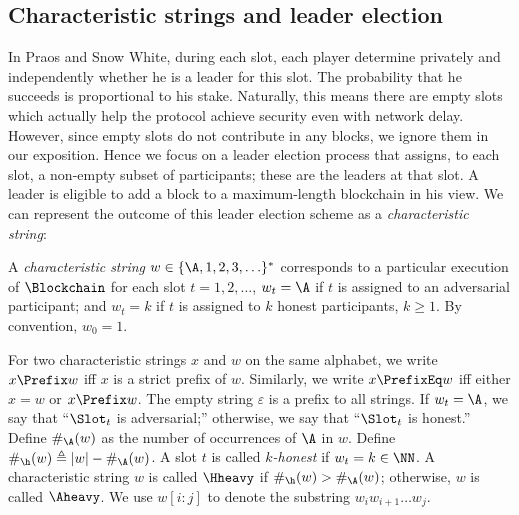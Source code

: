\subsection{Characteristic strings and leader election}
In Praos and Snow White, 
during each slot, 
each player determine privately and independently 
whether he is a leader for this slot. 
The probability that he succeeds is proportional to his stake. 
Naturally, this means there are empty slots 
which actually help the protocol achieve 
security even with network delay. 
However, since empty slots do not contribute in any blocks, 
we ignore them in our exposition. 
Hence we focus on a leader election process that assigns, 
to each slot, 
a non-empty subset of participants; 
these are the leaders at that slot. 
A leader is eligible to add a block to a 
maximum-length blockchain in his view. 
We can represent the outcome of this leader election scheme 
as a \emph{characteristic string}:


\begin{definition}\label{def:char-string}
  A \emph{characteristic string} $w \in \{\A, 1, 2, 3, \ldots \}^*$ 
  corresponds to a particular execution of $\Blockchain$ 
  for each slot $t = 1, 2, \ldots$, 
  $w_t = \A$ if $t$ is assigned to an adversarial participant; and 
  $w_t = k$ if $t$ is assigned to $k$ honest participants, 
  $k \geq 1$.
  By convention, $w_0 = 1$.
\end{definition}

For two characteristic strings $x$ and $w$ on the same alphabet, 
we write $x \Prefix w$ iff $x$ is a strict prefix of $w$. 
Similarly, 
we write $x \PrefixEq w$ iff either $x = w$ or $x \Prefix w$. 
The empty string $\varepsilon$ is a prefix to all strings. 
If $w_t = \A$, we say that ``$\Slot_t$ is adversarial;'' 
otherwise, we say that ``$\Slot_t$ is honest.'' 
Define $\#_\A(w)$ as the number of occurrences of $\A$ in $w$. 
Define $\#_\h(w) \triangleq |w| - \#_\A(w)$.
A slot $t$ is called \emph{$k$-honest} if $w_t = k \in \NN$.
A characteristic string $w$ is called $\Hheavy$ if 
$\#_\h(w) > \#_\A(w)$; 
otherwise, $w$ is called $\Aheavy$. 
We use $w[i : j]$ to denote the substring $w_i w_{i+1}\ldots w_j$.



